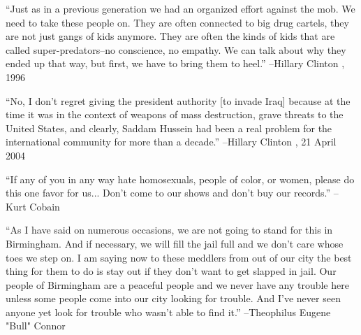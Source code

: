 \documentclass{article}%
\begin{document}
\linebreak%
\vspace{1mm}%
\begin{minipage}{\textwidth}%
\flushleft%
“Just as in a previous generation we had an organized effort against the mob. We need to take these people on. They are often connected to big drug cartels, they are not just gangs of kids anymore. They are often the kinds of kids that are called super{-}predators–no conscience, no empathy. We can talk about why they ended up that way, but first, we have to bring them to heel.”%
\linebreak%
\vspace{1mm}%
–Hillary Clinton%
, 1996%
\linebreak%
\vspace{1mm}%
\end{minipage}%
\linebreak%
\vspace{1mm}%
\begin{minipage}{\textwidth}%
\flushleft%
“No, I don't regret giving the president authority {[}to invade Iraq{]} because at the time it was in the context of weapons of mass destruction, grave threats to the United States, and clearly, Saddam Hussein had been a real problem for the international community for more than a decade.”%
\linebreak%
\vspace{1mm}%
–Hillary Clinton%
, 21 April 2004%
\linebreak%
\vspace{1mm}%
\end{minipage}%
\linebreak%
\vspace{1mm}%
\begin{minipage}{\textwidth}%
\flushleft%
“If any of you in any way hate homosexuals, people of color, or women, please do this one favor for us... Don't come to our shows and don't buy our records.”%
\linebreak%
\vspace{1mm}%
–Kurt Cobain%
\linebreak%
\vspace{1mm}%
\end{minipage}%
\linebreak%
\vspace{1mm}%
\begin{minipage}{\textwidth}%
\flushleft%
“As I have said on numerous occasions, we are not going to stand for this in Birmingham. And if necessary, we will fill the jail full and we don't care whose toes we step on. I am saying now to these meddlers from out of our city the best thing for them to do is stay out if they don't want to get slapped in jail. Our people of Birmingham are a peaceful people and we never have any trouble here unless some people come into our city looking for trouble. And I've never seen anyone yet look for trouble who wasn't able to find it.”%
\linebreak%
\vspace{1mm}%
–Theophilus Eugene "Bull" Connor%
\linebreak%
\vspace{1mm}%
\end{minipage}%
\end{document}
